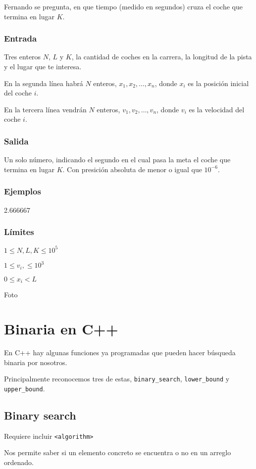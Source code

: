 Fernando se pregunta, en que tiempo (medido en segundos) cruza el coche que termina en lugar \(K\).

\subsubsection*{Entrada}
Tres enteros \(N\), \(L\) y \(K\), la cantidad de coches en la carrera, la longitud de la pista y el lugar que te interesa.

En la segunda línea habrá \(N\) enteros, \(x_1, x_2, \ldots, x_n\), donde \(x_i\) es la posición inicial del coche \(i\).

En la tercera línea vendrán \(N\) enteros, \(v_1, v_2, \ldots, v_n\), donde \(v_i\) es la velocidad del coche \(i\).

\subsubsection*{Salida}
Un solo número, indicando el segundo en el cual pasa la meta el coche que termina en lugar \(K\). Con presición absoluta de menor o igual que \(10^{-6}\).

\subsubsection*{Ejemplos}
\begin{casebox2}
	  {
		2.666667
	}
\end{casebox2}
\subsubsection*{Límites}
\begin{plimits}
	\item \(1\leq N, L, K \leq 10^5\)
	\item \(1\leq v_i, \leq 10^3\)
	\item \(0 \leq x_i < L\)
\end{plimits}

\problembreak

\problemtitle Foto


\section*{Binaria en C++}
En C++ hay algunas funciones ya programadas que pueden hacer búsqueda binaria por nosotros.

Principalmente reconocemos tres de estas, \verb|binary_search|, \verb|lower_bound| y \verb|upper_bound|.

\subsection*{Binary search}
Requiere incluir \verb|<algorithm>|

Nos permite saber si un elemento concreto se encuentra o no en un arreglo ordenado.
